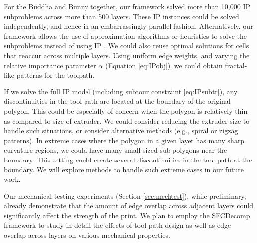 For the Buddha and Bunny together, our framework solved more than 10,000 IP subproblems across more than 500 layers.
These IP instances could be solved independently, and hence in an embarrassingly parallel fashion.
Alternatively, our framework allows the use of approximation algorithms or heuristics to solve the subproblems instead of using IP \cite{ApBiChCo2007}.
We could also reuse optimal solutions for cells that reoccur across multiple layers.
Using uniform edge weights, and varying the relative importance parameter $\alpha$ (Equation \ref{eq:IPobj}), we could obtain fractal-like patterns for the toolpath.  

If we solve the full IP model (including subtour constraint \ref{eq:IPsubtr}), any discontinuities in the tool path are located at the boundary of the original polygon. 
This could be especially of concern when the polygon is relatively thin as compared to size of extruder.
We could consider reducing the extruder size to handle such situations, or consider alternative methods (e.g., spiral or zigzag patterns).
In extreme cases where the polygon in a given layer has many sharp curvature regions, we could have many small sized sub-polygons near the boundary.
This setting could create several discontinuities in the tool path at the boundary.
We will explore methods to handle such extreme cases in our future work.

Our mechanical testing experiments (Section \ref{sec:mechtest}), while preliminary, already demonstrate that the amount of edge overlap across adjacent layers could significantly affect the strength of the print.
We plan to employ the SFCDecomp framework to study in detail the effects of tool path design as well as edge overlap across layers on various mechanical properties.